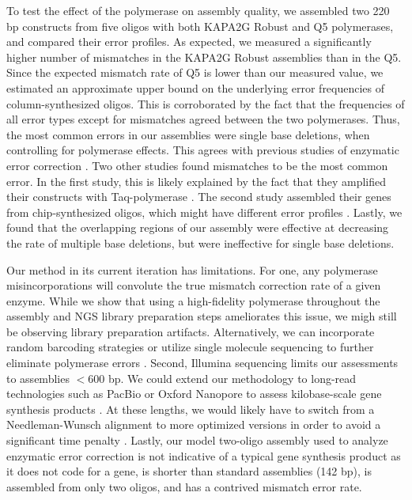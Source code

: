 \documentclass[twocolumn]{article}
\begin{document}
To test the effect of the polymerase on assembly quality, we assembled two 220 bp constructs from five oligos with both KAPA2G Robust and Q5 polymerases, and compared their error profiles. As expected, we measured a significantly higher number of mismatches in the KAPA2G Robust assemblies than in the Q5. Since the expected mismatch rate of Q5 is lower than our measured value, we estimated an approximate upper bound on the underlying error frequencies of column-synthesized oligos. This is corroborated by the fact that the frequencies of all error types except for mismatches agreed between the two polymerases. Thus, the most common errors in our assemblies were single base deletions, when controlling for polymerase effects. This agrees with previous studies of enzymatic error correction \cite{carr2004,sequeira2016,saaem2012}. Two other studies found mismatches to be the most common error. In the first study, this is likely explained by the fact that they amplified their constructs with Taq-polymerase \cite{fuhrmann2005}. The second study assembled their genes from chip-synthesized oligos, which might have different error profiles \cite{wan2014}. Lastly, we found that the overlapping regions of our assembly were effective at decreasing the rate of multiple base deletions, but were ineffective for single base deletions.

Our method in its current iteration has limitations. For one, any polymerase misincorporations will convolute the true mismatch correction rate of a given enzyme. While we show that using a high-fidelity polymerase throughout the assembly and NGS library preparation steps ameliorates this issue, we migh still be observing library preparation artifacts. Alternatively, we can incorporate random barcoding strategies or utilize single molecule sequencing to further eliminate polymerase errors \cite{hestand2016,potapov2017,lee2016}. Second, Illumina sequencing limits our assessments to assemblies $<600$ bp. We could extend our methodology to long-read technologies such as PacBio or Oxford Nanopore to assess kilobase-scale gene synthesis products \cite{carson2015}. At these lengths, we would likely have to switch from a Needleman-Wunsch alignment to more optimized versions in order to avoid a significant time penalty \cite{chakraborty2013}. Lastly, our model two-oligo assembly used to analyze enzymatic error correction is not indicative of a typical gene synthesis product as it does not code for a gene, is shorter than standard assemblies (142 bp), is assembled from only two oligos, and has a contrived mismatch error rate.
\end{document}
